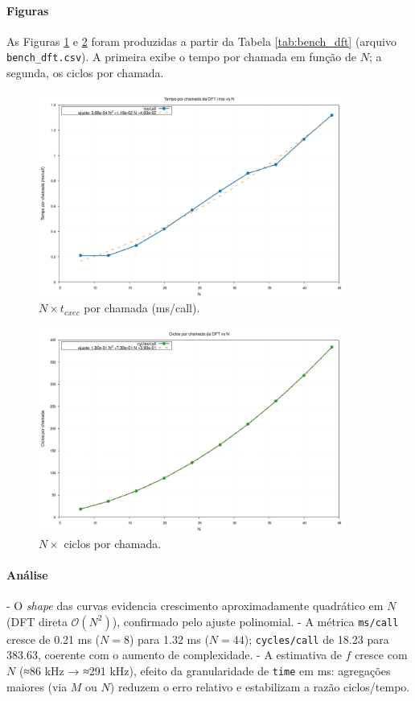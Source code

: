 \documentclass[12pt,a4paper]{article}
\begin{document}
\paragraph{Figuras}
As Figuras \ref{fig:n_vs_texec} e \ref{fig:n_vs_cycles} foram produzidas a partir da Tabela \ref{tab:bench_dft} (arquivo \texttt{bench\_dft.csv}). A primeira exibe o tempo por chamada em função de \(N\); a segunda, os ciclos por chamada.

\begin{figure}[H]
\centering
\includegraphics[width=0.9\textwidth]{fig_n_vs_ms_call.png}
\caption{$N \times t_{exec}$ por chamada (ms/call).}
\label{fig:n_vs_texec}
\end{figure}

\begin{figure}[H]
\centering
\includegraphics[width=0.9\textwidth]{fig_n_vs_cycles_call.png}
\caption{$N \times$ ciclos por chamada.}
\label{fig:n_vs_cycles}
\end{figure}

\paragraph{Análise}
- O \textit{shape} das curvas evidencia crescimento aproximadamente quadrático em \(N\) (DFT direta \(\mathcal{O}(N^2)\)), confirmado pelo ajuste polinomial.
- A métrica \texttt{ms/call} cresce de 0.21 ms (\(N=8\)) para 1.32 ms (\(N=44\)); \texttt{cycles/call} de 18.23 para 383.63, coerente com o aumento de complexidade.
- A estimativa de \(f\) cresce com \(N\) (≈86 kHz → ≈291 kHz), efeito da granularidade de \texttt{time} em ms: agregações maiores (via \(M\) ou \(N\)) reduzem o erro relativo e estabilizam a razão ciclos/tempo.
\end{document}
